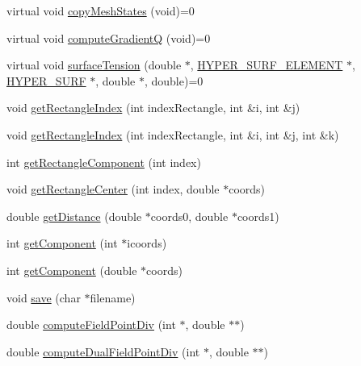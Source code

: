 \begin{DoxyCompactItemize}
\item 
virtual void \hyperlink{class_incompress___solver___smooth___basis_add1059a795fb2eb925cd983088bb884d}{copy\+Mesh\+States} (void)=0
\item 
virtual void \hyperlink{class_incompress___solver___smooth___basis_a8d951b5c02243828b480de8eed32315c}{compute\+GradientQ} (void)=0
\item 
virtual void \hyperlink{class_incompress___solver___smooth___basis_a38d025139a192414bef50db30b81e893}{surface\+Tension} (double $\ast$, \hyperlink{int_8h_a17e21ae7174174d7a55516f8c9a8f12f}{H\+Y\+P\+E\+R\+\_\+\+S\+U\+R\+F\+\_\+\+E\+L\+E\+M\+E\+NT} $\ast$, \hyperlink{int_8h_acef50fa4757ce0d3f75c97fab5a175bc}{H\+Y\+P\+E\+R\+\_\+\+S\+U\+RF} $\ast$, double $\ast$, double)=0
\item 
void \hyperlink{class_incompress___solver___smooth___basis_a304a6c4575210fe7f21f12235b66552b}{get\+Rectangle\+Index} (int index\+Rectangle, int \&i, int \&j)
\item 
void \hyperlink{class_incompress___solver___smooth___basis_a7ff9bc51c0a84b4206a6225d590f6f01}{get\+Rectangle\+Index} (int index\+Rectangle, int \&i, int \&j, int \&k)
\item 
int \hyperlink{class_incompress___solver___smooth___basis_aabd75ec2f0d5bdfb86bea20c506ff9b4}{get\+Rectangle\+Component} (int index)
\item 
void \hyperlink{class_incompress___solver___smooth___basis_a1593054b9dd7870fcf5f856eea16fc2b}{get\+Rectangle\+Center} (int index, double $\ast$coords)
\item 
double \hyperlink{class_incompress___solver___smooth___basis_a96061631c9a8212cc986e103a4a1695c}{get\+Distance} (double $\ast$coords0, double $\ast$coords1)
\item 
int \hyperlink{class_incompress___solver___smooth___basis_a771b4c77ff4164b8639166c8a63b97dc}{get\+Component} (int $\ast$icoords)
\item 
int \hyperlink{class_incompress___solver___smooth___basis_a1ccb12d77c7e05319dc670a138ee1d29}{get\+Component} (double $\ast$coords)
\item 
void \hyperlink{class_incompress___solver___smooth___basis_adcdbd6047e035969c19bc6afc4e7e886}{save} (char $\ast$filename)
\item 
double \hyperlink{class_incompress___solver___smooth___basis_a535f5d07878d23b177aaeef4cd12e1c4}{compute\+Field\+Point\+Div} (int $\ast$, double $\ast$$\ast$)
\item 
double \hyperlink{class_incompress___solver___smooth___basis_a5f8602517f1970a9e6eb16ac87db43fa}{compute\+Dual\+Field\+Point\+Div} (int $\ast$, double $\ast$$\ast$)

\end{DoxyCompactItemize}
